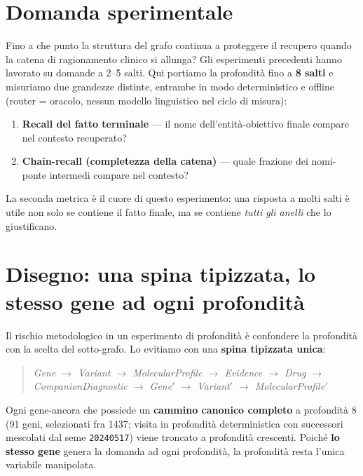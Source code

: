 \documentclass[11pt,a4paper]{report}
\begin{document}
\section{Domanda sperimentale}

Fino a che punto la struttura del grafo continua a proteggere il recupero quando la catena
di ragionamento clinico si allunga? Gli esperimenti precedenti hanno lavorato su domande a
2--5 salti. Qui portiamo la profondità fino a \textbf{8 salti} e misuriamo due grandezze
distinte, entrambe in modo deterministico e offline (router = oracolo, nessun modello
linguistico nel ciclo di misura):

\begin{enumerate}
  \item \textbf{Recall del fatto terminale} --- il nome dell'entità-obiettivo finale compare
        nel contesto recuperato?
  \item \textbf{Chain-recall (completezza della catena)} --- quale frazione dei nomi-ponte
        intermedi compare nel contesto?
\end{enumerate}

La seconda metrica è il cuore di questo esperimento: una risposta a molti salti è utile non
solo se contiene il fatto finale, ma se contiene \emph{tutti gli anelli} che lo giustificano.

\section{Disegno: una spina tipizzata, lo stesso gene ad ogni profondità}

Il rischio metodologico in un esperimento di profondità è confondere la profondità con la
scelta del sotto-grafo. Lo evitiamo con una \textbf{spina tipizzata unica}:

\begin{quote}\itshape
Gene $\rightarrow$ Variant $\rightarrow$ MolecularProfile $\rightarrow$ Evidence
$\rightarrow$ Drug $\rightarrow$ CompanionDiagnostic $\rightarrow$ Gene$'$
$\rightarrow$ Variant$'$ $\rightarrow$ MolecularProfile$'$
\end{quote}

Ogni gene-ancora che possiede un \textbf{cammino canonico completo} a profondità 8
(\num{91} geni, selezionati fra \num{1437}; visita in profondità deterministica con
successori mescolati dal seme \texttt{20240517}) viene troncato a profondità crescenti.
Poiché \textbf{lo stesso gene} genera la domanda ad ogni profondità, la profondità resta
l'unica variabile manipolata.
\end{document}
